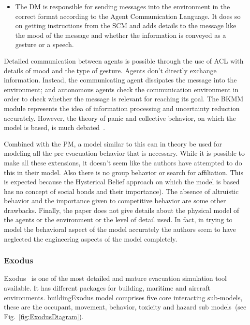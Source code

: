 \begin{itemize}
\item
The DM is responsible for sending messages into the environment in the correct format according to the Agent Communication Language. It does so on getting instructions from the SCM and adds details to the message like the mood of the message and whether the information is conveyed as a gesture or a speech.
\end{itemize}

Detailed communication between agents is possible through the use of ACL with details of mood and the type of gesture. Agents don't directly exchange information. Instead, the communicating agent dissipates the message into the environment; and autonomous agents check the communication environment in order to check whether the message is relevant for reaching its goal. The BKMM module represents the idea of information processing and uncertainty reduction accurately. However, the theory of panic and collective behavior, on which the model is based, is much debated~\cite{Torres:2010tj, Sime:1995uu}.

Combined with the PM, a model similar to this can in theory be used for modeling all the pre-evacuation behavior that is necessary. While it is possible to make all these extensions, it doesn't seem like the authors have attempted to do this in their model. Also there is no group behavior or search for affiliation. This is expected because the Hysterical Belief approach on which the model is based has no concept of social bonds and their importance). The absence of altruistic behavior and the importance given to competitive behavior are some other drawbacks. Finally, the paper does not give details about the physical model of the agents or the environment or the level of detail used. In fact, in trying to model the behavioral aspect of the model accurately the authors seem to have neglected the engineering aspects of the model completely.

\subsubsection{Exodus}

Exodus~\cite{Owen:1996jh} is one of the most detailed and mature evacuation simulation tool available. It has different packages for building, maritime and aircraft environments. buildingExodus model comprises five core interacting sub-models, these are the occupant, movement, behavior, toxicity and hazard sub models~(see Fig.~\ref{fig:ExodusDiagram}).

